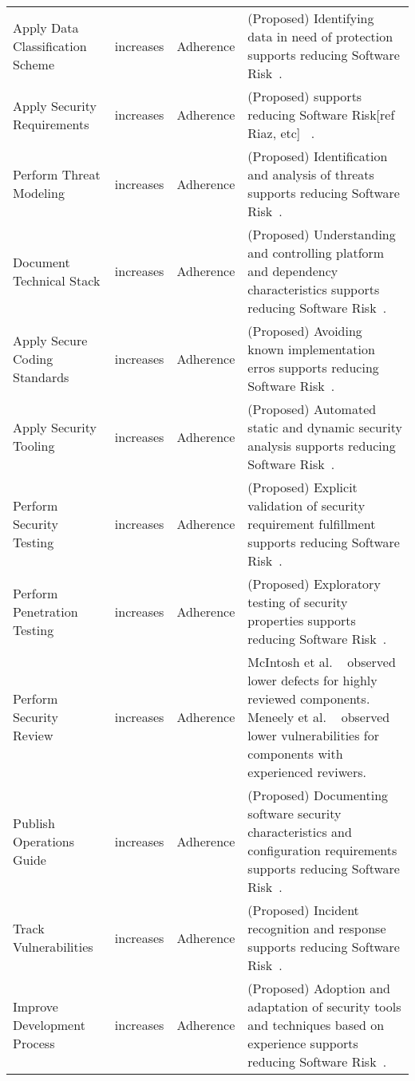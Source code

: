 \begin{table*}[!htbp]
\begin{scriptsize}
\begin{tabular}{p{1.75cm}p{1cm}p{1cm}p{6cm}}
			Apply Data Classification Scheme & increases & 	Adherence & (Proposed) Identifying data in need of protection supports reducing Software Risk~\cite{morrison2017surveying}.\\	
			Apply Security Requirements	&	increases	&	Adherence & (Proposed)  supports reducing Software Risk[ref Riaz, etc] ~\cite{morrison2017surveying}.\\
			Perform Threat Modeling &	increases &	Adherence &(Proposed) Identification and analysis of threats supports reducing Software Risk~\cite{morrison2017surveying}. \\	
			Document Technical Stack &	increases &	Adherence & (Proposed) Understanding and controlling platform and dependency characteristics supports reducing Software Risk~\cite{morrison2017surveying}.\\	
			Apply Secure Coding Standards &	increases	& Adherence & (Proposed)  Avoiding known implementation erros supports reducing Software Risk~\cite{morrison2017surveying}.\\
			Apply Security Tooling &	increases &	Adherence & (Proposed)  Automated static and dynamic security analysis supports reducing Software Risk~\cite{morrison2017surveying}.\\
			Perform Security Testing &	increases &	Adherence & (Proposed)  Explicit validation of security requirement fulfillment supports reducing Software Risk~\cite{morrison2017surveying}.\\	
			Perform Penetration Testing &	increases &	Adherence	& (Proposed)  Exploratory testing of security properties supports reducing Software Risk~\cite{morrison2017surveying}.\\
			Perform Security Review &	increases &	Adherence	&  McIntosh et al. ~\cite{mcintosh2014the} observed lower defects for highly reviewed components. Meneely et al. ~\cite{meneely2014empirical} observed lower vulnerabilities for components with experienced reviwers. \\
			Publish Operations Guide &	increases	& Adherence & (Proposed) Documenting software security characteristics and configuration requirements supports reducing Software Risk~\cite{morrison2017surveying}.\\
			Track Vulnerabilities &	increases &	Adherence & (Proposed) Incident recognition and response supports reducing Software Risk~\cite{morrison2017surveying}.\\	
			Improve Development Process &	increases &	Adherence & (Proposed)  Adoption and adaptation of security tools and techniques based on experience supports reducing Software Risk~\cite{morrison2017surveying}.\\	

\end{tabular}
\end{scriptsize}
\end{table*}
